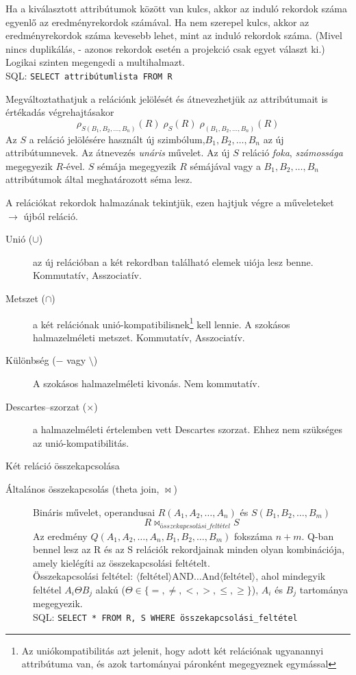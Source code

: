 \begin{description}[nosep]
	Ha a kiválasztott attribútumok között van kulcs, akkor az induló rekordok száma egyenlő az eredményrekordok számával. Ha nem szerepel kulcs, akkor az eredményrekordok száma kevesebb lehet, mint az induló rekordok száma. (Mivel nincs duplikálás, - azonos rekordok esetén a projekció csak egyet választ ki.)\\
	Logikai szinten megengedi a multihalmazt.\\
	SQL: \verb|SELECT attribútumlista FROM R|
	\item[Átnevezés ($\rho$)] Megváltoztathatjuk a relációnk jelölését és átnevezhetjük az attribútumait is értékadás végrehajtásakor
	$$\rho_{S(B_1,B_2,\dots,B_n)}(R)\;\rho_S(R)\;\rho_{(B_1,B_2,\dots,B_n)}(R)$$
	Az $S$ a reláció jelölésére használt új szimbólum,$ B_1, B_2, \dots, B_n$ az új attribútumnevek. Az átnevezés \emph{unáris} művelet. Az új $S$ reláció \emph{foka}, \emph{számossága} megegyezik $R$-ével. $S$ sémája megegyezik $R$ sémájával vagy a $B_1,B_2,\dots,B_n$ attribútumok által meghatározott séma lesz.
	\item[Halmazműveletek] A relációkat rekordok halmazának tekintjük, ezen hajtjuk végre a műveleteket $\rightarrow$ újból reláció.
	\begin{description}
		\item[Unió ($\cup$)] az új relációban a két rekordban található elemek uiója lesz benne. Kommutatív, Asszociatív.
		\item[Metszet ($\cap$)] a két relációnak unió-kompatibilisnek\footnote{Az uniókompatibilitás azt jelenit, hogy adott két relációnak ugyanannyi attribútuma van, és azok tartományai páronként megegyeznek egymással} kell lennie. A szokásos halmazelméleti metszet. Kommutatív, Asszociatív.
		\item[Különbség ($-$ vagy $\setminus$)] A szokásos halmazelméleti kivonás. Nem kommutatív.
		\item[Descartes--szorzat ($\times$)] a halmazelméleti értelemben vett Descartes szorzat. Ehhez nem szükséges az unió-kompatibilitás.
	\end{description}
	\item[Összekapcsolás (join)] Két reláció összekapcsolása
	\begin{description}
		\item[Általános összekapcsolás (theta join, $\bowtie$)] Bináris művelet, operandusai $R(A_1,A_2,\dots,A_n)$ és $S(B_1,B_2,\dots,B_m)$
		$$R\bowtie_{összekapcsolási\_feltétel}S$$
		Az eredmény $Q(A_1,A_2,\dots,A_n,B_1,B_2,\dots,B_m)$ fokszáma $n+m$. Q-ban bennel lesz az R és az S relációk rekordjainak minden olyan kombinációja, amely kielégíti az összekapcsolási feltételt.\\
		Összekapcsolási feltétel: $\langle\text{feltétel}\rangle\text{AND}\dots\text{And}\langle\text{feltétel}\rangle$, ahol mindegyik feltétel $A_i\Theta B_j$ alakú ($\Theta\in\{=,\neq,<,>,\leq,\geq \}$), $A_i$ és $B_j$ tartománya megegyezik.\\
		SQL: \verb|SELECT * FROM R, S WHERE összekapcsolási_feltétel|
		

\end{description}
\end{description}

